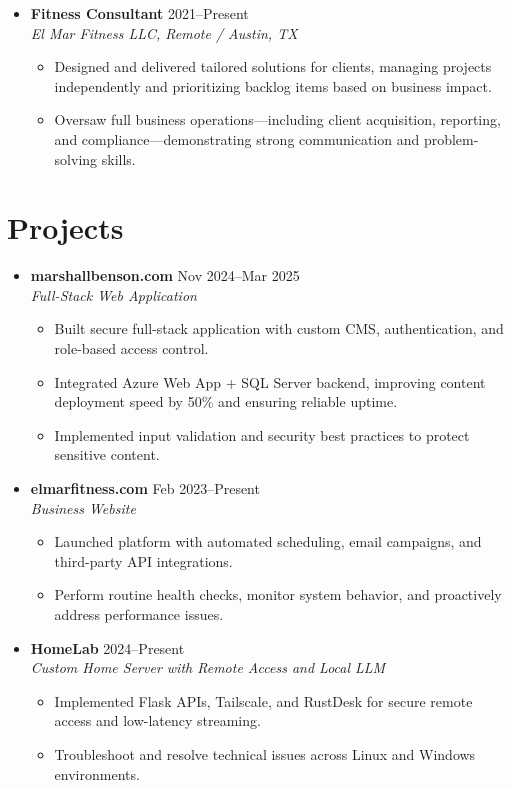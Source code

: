 \documentclass[letterpaper,10pt]{article}
\newcommand{\resumeItem}[1]{\item \small{#1}}
\begin{document}
\begin{itemize}
  \item[]
    \textbf{Fitness Consultant} \hfill 2021--Present \\
    \textit{El Mar Fitness LLC, Remote / Austin, TX}
  \begin{itemize}
    \resumeItem{Designed and delivered tailored solutions for clients, managing projects independently and prioritizing backlog items based on business impact.}
    \resumeItem{Oversaw full business operations---including client acquisition, reporting, and compliance---demonstrating strong communication and problem-solving skills.}
  \end{itemize}
\end{itemize}

\section*{Projects}
\begin{itemize}
  \item[]
    \textbf{marshallbenson.com} \hfill Nov 2024--Mar 2025 \\
    \textit{Full-Stack Web Application}
  \begin{itemize}
    \resumeItem{Built secure full-stack application with custom CMS, authentication, and role-based access control.}
    \resumeItem{Integrated Azure Web App + SQL Server backend, improving content deployment speed by 50\% and ensuring reliable uptime.}
    \resumeItem{Implemented input validation and security best practices to protect sensitive content.}
  \end{itemize}

  \item[]
    \textbf{elmarfitness.com} \hfill Feb 2023--Present \\
    \textit{Business Website}
  \begin{itemize}
    \resumeItem{Launched platform with automated scheduling, email campaigns, and third-party API integrations.}
    \resumeItem{Perform routine health checks, monitor system behavior, and proactively address performance issues.}
  \end{itemize}

  \item[]
    \textbf{HomeLab} \hfill 2024--Present \\
    \textit{Custom Home Server with Remote Access and Local LLM}
  \begin{itemize}
    \resumeItem{Implemented Flask APIs, Tailscale, and RustDesk for secure remote access and low-latency streaming.}
    \resumeItem{Troubleshoot and resolve technical issues across Linux and Windows environments.}
  \end{itemize}
\end{itemize}
\end{document}
